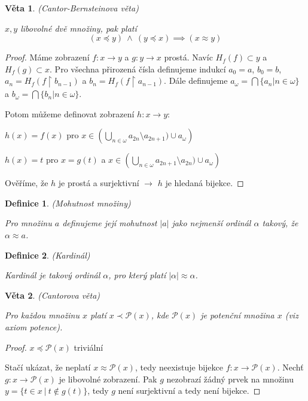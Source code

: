 \documentclass[a4paper,10pt,titlepage]{article} \usepackage[utf8]{inputenc}
\newtheorem{theorem}{Věta}
\newtheorem{define}{Definice}
\begin{document}
\begin{theorem}
(Cantor-Bernsteinova věta)

$x,y$ libovolné dvě množiny, pak platí
\[
(x \preceq y) \ \wedge \ (y \preceq x) \implies (x \approx y)
\]
\end{theorem}

\begin{proof}
Máme zobrazení $f: x \rightarrow y$ a $g: y \rightarrow x$ prostá.
Navíc $H_f(f) \subset y$ a $H_f(g) \subset x$.
Pro všechna přirozená čísla definujeme indukcí $a_0 = a$, $b_0 = b$, $a_n = H_f(f\upharpoonright b_{n-1})$ a
$b_n = H_f(f\upharpoonright a_{n-1})$. Dále definujeme $a_{\omega} = \bigcap \{a_n | n \in \omega\}$ a
$b_{\omega} = \bigcap \{b_n | n \in \omega\}$.

Potom můžeme definovat zobrazení $h: x \rightarrow y$:
\begin{center}
$h(x) = f(x)$  pro $x \in \left(\bigcup_{n \in \omega} a_{2n} \setminus a_{2n+1}) \cup a_{\omega}\right)$

$h(x) = t$  pro $x = g(t)$ a $x \in \left(\bigcup_{n \in \omega} a_{2n+1} \setminus a_{2n}) \cup a_{\omega}\right)$
\end{center}
Ověříme, že $h$ je prostá a surjektivní $\rightarrow$ $h$ je hledaná bijekce.
\end{proof}

\begin{define}
(Mohutnost množiny)

Pro množinu $a$ definujeme její mohutnost $|a|$ jako nejmenší ordinál $\alpha$ takový, že $\alpha \approx a$.
\end{define}

\begin{define}
(Kardinál)

Kardinál je takový ordinál $\alpha$, pro který platí $|\alpha| \approx \alpha$.
\end{define}

\begin{theorem}
(Cantorova věta)

Pro každou množinu $x$ platí $x \prec \mathcal{P}(x)$, kde $\mathcal{P}(x)$ je potenční množina $x$ (viz axiom potence).
\end{theorem}

\begin{proof}
$x \preceq \mathcal{P}(x)$ triviální

Stačí ukázat, že neplatí $x \approx \mathcal{P}(x)$, tedy neexistuje bijekce $f: x \rightarrow \mathcal{P}(x)$.
Nechť $g: x \rightarrow \mathcal{P}(x)$ je libovolné zobrazení.
Pak $g$ nezobrazí žádný prvek na množinu $y = \{t\in x\  |\ t \notin g(t)\}$, tedy $g$ není surjektivní a tedy není bijekce.
\end{proof}
\end{document}
